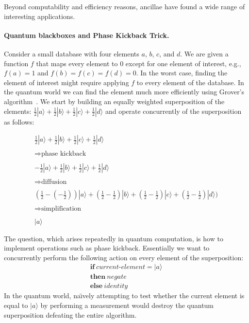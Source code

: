 \documentclass[sigplan,10pt,review,anonymous]{acmart}
\newcommand{\ket}[1]{|#1\rangle}
\begin{document}
Beyond computability and efficiency reasons, ancillae have found a
wide range of interesting applications. 

\paragraph*{Quantum blackboxes and Phase Kickback Trick.} Consider a
small database with four elements $a$, $b$, $c$, and $d$. We are given
a function $f$ that maps every element to $0$ except for one element
of interest, e.g., $f(a)=1$ and $f(b)=f(c)=f(d)=0$. In the worst case,
finding the element of interest might require applying $f$ to every
element of the database. In the quantum world we can find the element
much more efficiently using Grover's
algorithm~\cite{Grover:1996:FQM:237814.237866}. We start by building
an equally weighted superposition of the elements:
$\frac{1}{2}\ket{a}+\frac{1}{2}\ket{b}+\frac{1}{2}\ket{c}+\frac{1}{2}\ket{d}$
and operate concurrently of the superposition as follows:

\[\begin{array}{l}
                    \frac{1}{2}\ket{a}+\frac{1}{2}\ket{b}+\frac{1}{2}\ket{c}+\frac{1}{2}\ket{d}\\
\\
\Rightarrow  \textrm{phase kickback} \\
\\
-\frac{1}{2}\ket{a}+\frac{1}{2}\ket{b}+\frac{1}{2}\ket{c}+\frac{1}{2}\ket{d}\\
\\
\Rightarrow  \textrm{diffusion} \\
\\
 (\frac{1}{2}-(-\frac{1}{2}))\ket{a}+(\frac{1}{2}-\frac{1}{2})\ket{b}+(\frac{1}{2}-\frac{1}{2})\ket{c}+(\frac{1}{2}-\frac{1}{2})\ket{d})\\
\\
\Rightarrow  \textrm{simplification} \\
\\
\ket{a}
\end{array}\]

The question, which arises repeatedly in quantum computation, is how
to implement operations such as phase kickback. Essentially we want to
concurrently perform the following action on every element of the
superposition:
\[\begin{array}{l}
  \textbf{if}~\textit{current-element}=\ket{a} \\
  \textbf{then}~\textit{negate} \\
  \textbf{else}~\textit{identity}
\end{array}\]
In the quantum world, na\"\i vely attempting to test whether the
current element is equal to $\ket{a}$ by performing a measurement would
destroy the quantum superposition defeating the entire algorithm.
\end{document}
